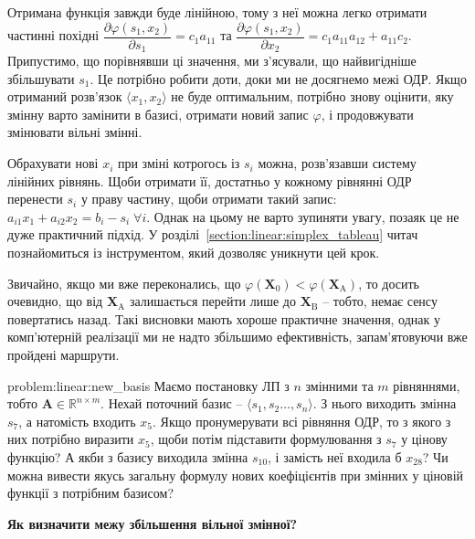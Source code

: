 \documentclass[\main/book.tex]{subfiles}
\begin{document}
Отримана функція завжди буде лінійною, тому з неї можна легко отримати частинні похідні $\dfrac{\partial \varphi(s_1, x_2)}{\partial s_1} = c_1 a_{11}$ та $\dfrac{\partial \varphi(s_1, x_2)}{\partial x_2} = c_1 a_{11} a_{12} + a_{11} c_2$. Припустимо, що порівнявши ці значення, ми з'ясували, що найвигідніше збільшувати $s_1$. Це потрібно робити доти, доки ми не досягнемо межі ОДР. Якщо отриманий розв'язок ${\langle x_1, x_2 \rangle}$ не буде оптимальним, потрібно знову оцінити, яку змінну варто замінити в базисі, отримати новий запис $\varphi$, і продовжувати змінювати вільні змінні.

\begin{note}
 Обрахувати нові $x_i$ при зміні котрогось із $s_i$ можна, розв'язавши систему лінійних рівнянь. Щоби отримати її, достатньо у кожному рівнянні ОДР перенести $s_i$ у праву частину, щоби отримати такий запис: $a_{i1} x_1 + a_{i2} x_2 = b_i - s_i \; \forall i$. Однак на цьому не варто зупиняти увагу, позаяк це не дуже практичний підхід. У розділі~\ref{section:linear:simplex_tableau} читач познайомиться із інструментом, який дозволяє уникнути цей крок.
\end{note}

\begin{note}
 Звичайно, якщо ми вже переконались, що ${\varphi(\mathbf{X}_0) < \varphi(\mathbf{X}_\mathrm{A})}$, то досить очевидно, що від $\mathbf{X}_\mathrm{A}$ залишається перейти лише до $\mathbf{X}_\mathrm{B}$ -- тобто, немає сенсу повертатись назад. Такі висновки мають хороше практичне значення, однак у комп'ютерній реалізації ми не надто збільшимо ефективність, запам'ятовуючи вже пройдені маршрути.
\end{note}

\begin{problem}{problem:linear:new_basis}
 Маємо постановку ЛП з $n$ змінними та $m$ рівняннями, тобто $\mathbf{A} \in \mathbb{R}^{n \times m}$. Нехай поточний базис -- $\langle s_1, s_2 \ldots, s_n \rangle$. З нього виходить змінна $s_7$, а натомість входить $x_5$. Якщо пронумерувати всі рівняння ОДР, то з якого з них потрібно виразити $x_5$, щоби потім підставити формулювання з $s_7$ у цінову функцію? А якби з базису виходила змінна $s_{10}$, і замість неї входила б $x_{28}$? Чи можна вивести якусь загальну формулу нових коефіцієнтів при змінних у ціновій функції з потрібним базисом?
\end{problem}

\textbf{Як визначити межу збільшення вільної змінної?} \quad
\end{document}
